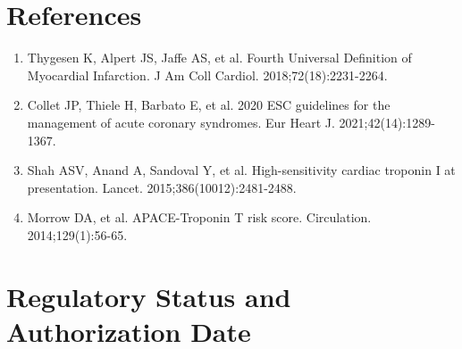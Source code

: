 \section*{References}
\begin{enumerate}
  \item Thygesen K, Alpert JS, Jaffe AS, et al. Fourth Universal Definition of Myocardial Infarction. J Am Coll Cardiol. 2018;72(18):2231-2264.
  \item Collet JP, Thiele H, Barbato E, et al. 2020 ESC guidelines for the management of acute coronary syndromes. Eur Heart J. 2021;42(14):1289-1367.
  \item Shah ASV, Anand A, Sandoval Y, et al. High-sensitivity cardiac troponin I at presentation. Lancet. 2015;386(10012):2481-2488.
  \item Morrow DA, et al. APACE-Troponin T risk score. Circulation. 2014;129(1):56-65.
\end{enumerate}

\clearpage
\section*{Regulatory Status and Authorization Date}

\clearpage
